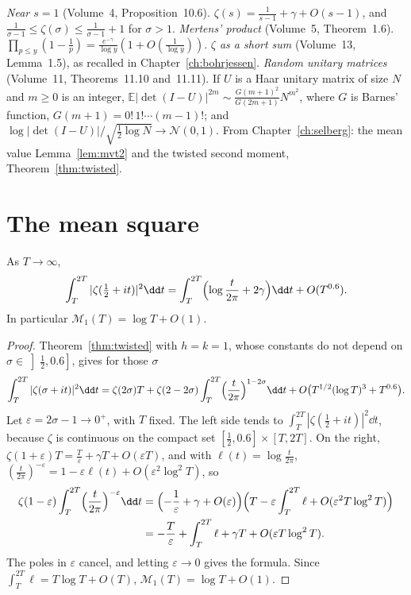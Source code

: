 \begin{reminder}
\emph{Near $s=1$} (Volume~4, Proposition~10.6). $\zeta(s)=\frac1{s-1}+\gamma+O(s-1)$, and $\frac1{\sigma-1}\le\zeta(\sigma)\le\frac1{\sigma-1}+1$ for $\sigma>1$.
\emph{Mertens' product} (Volume~5, Theorem~1.6). $\prod_{p\le y}(1-\frac1p)=\frac{e^{-\gamma}}{\log y}(1+O(\frac1{\log y}))$.
\emph{$\zeta$ as a short sum} (Volume~13, Lemma~1.5), as recalled in Chapter~\ref{ch:bohrjessen}.
\emph{Random unitary matrices} (Volume~11, Theorems~11.10 and~11.11). If $U$ is a Haar unitary matrix of size $N$ and $m\ge0$ is an integer, $\mathbb E|\det(I-U)|^{2m}\sim\frac{G(m+1)^2}{G(2m+1)}N^{m^2}$, where $G$ is Barnes' function, $G(m+1)=0!\,1!\cdots(m-1)!$; and $\log|\det(I-U)|/\sqrt{\frac12\log N}\to\mathcal N(0,1)$.
From Chapter~\ref{ch:selberg}: the mean value Lemma~\ref{lem:mvt2} and the twisted second moment, Theorem~\ref{thm:twisted}.
\end{reminder}

\section{The mean square}

\begin{theorem}\label{thm:ingham}
As $T\to\infty$,
\[
\int_T^{2T}|\zeta(\tfrac12+it)|^2\dd t=\int_T^{2T}\Bigl(\log\frac t{2\pi}+2\gamma\Bigr)\dd t+O(T^{0.6}).
\]
In particular $\mathcal M_1(T)=\log T+O(1)$.
\end{theorem}
\begin{proof}
Theorem~\ref{thm:twisted} with $h=k=1$, whose constants do not depend on $\sigma\in\left]\frac12,0.6\right]$, gives for those $\sigma$
\[
\int_T^{2T}|\zeta(\sigma+it)|^2\dd t=\zeta(2\sigma)T+\zeta(2-2\sigma)\int_T^{2T}\Bigl(\frac t{2\pi}\Bigr)^{1-2\sigma}\dd t+O\bigl(T^{1/2}(\log T)^3+T^{0.6}\bigr).
\]
Let $\varepsilon=2\sigma-1\to0^+$, with $T$ fixed. The left side tends to $\int_T^{2T}|\zeta(\frac12+it)|^2\dd t$, because $\zeta$ is continuous on the compact set $[\frac12,0.6]\times[T,2T]$. On the right, $\zeta(1+\varepsilon)T=\frac T\varepsilon+\gamma T+O(\varepsilon T)$, and with $\ell(t)=\log\frac t{2\pi}$, $(\frac t{2\pi})^{-\varepsilon}=1-\varepsilon\ell(t)+O(\varepsilon^2\log^2T)$, so
\[
\begin{aligned}
\zeta(1-\varepsilon)\int_T^{2T}\Bigl(\frac t{2\pi}\Bigr)^{-\varepsilon}\dd t
&=\Bigl(-\frac1\varepsilon+\gamma+O(\varepsilon)\Bigr)\Bigl(T-\varepsilon\int_T^{2T}\ell+O(\varepsilon^2T\log^2T)\Bigr)\\
&=-\frac T\varepsilon+\int_T^{2T}\ell+\gamma T+O(\varepsilon T\log^2T).
\end{aligned}
\]
The poles in $\varepsilon$ cancel, and letting $\varepsilon\to0$ gives the formula. Since $\int_T^{2T}\ell=T\log T+O(T)$, $\mathcal M_1(T)=\log T+O(1)$.
\end{proof}

